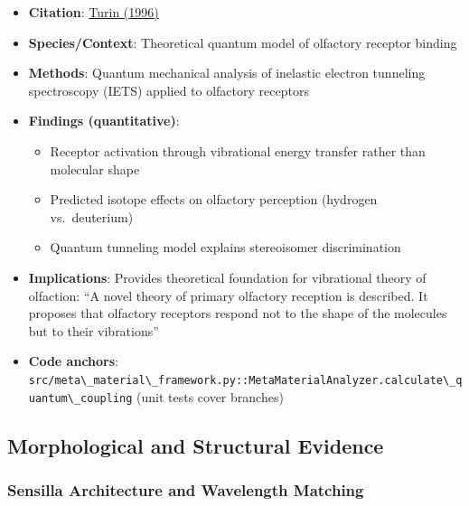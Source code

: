 \documentclass[
  13pt,
  a4paperpaper,
  12pt]{article}
\newcommand{\passthrough}[1]{#1}
\providecommand{\tightlist}{%
  \setlength{\itemsep}{0pt}\setlength{\parskip}{0pt}}
\begin{document}
\begin{itemize}
\tightlist
\item
  \textbf{Citation}:
  \href{https://doi.org/10.1093/chemse/21.6.773}{Turin (1996)}
\item
  \textbf{Species/Context}: Theoretical quantum model of olfactory
  receptor binding
\item
  \textbf{Methods}: Quantum mechanical analysis of inelastic electron
  tunneling spectroscopy (IETS) applied to olfactory receptors
\item
  \textbf{Findings (quantitative)}:

  \begin{itemize}
  \tightlist
  \item
    Receptor activation through vibrational energy transfer rather than
    molecular shape
  \item
    Predicted isotope effects on olfactory perception (hydrogen
    vs.~deuterium)
  \item
    Quantum tunneling model explains stereoisomer discrimination
  \end{itemize}
\item
  \textbf{Implications}: Provides theoretical foundation for vibrational
  theory of olfaction: ``A novel theory of primary olfactory reception
  is described. It proposes that olfactory receptors respond not to the
  shape of the molecules but to their vibrations''
\item
  \textbf{Code anchors}:
  \passthrough{\lstinline!src/meta\_material\_framework.py::MetaMaterialAnalyzer.calculate\_quantum\_coupling!}
  (unit tests cover branches)
\end{itemize}

\subsection{Morphological and Structural
Evidence}\label{morphological-and-structural-evidence}

\subsubsection{Sensilla Architecture and Wavelength
Matching}\label{sensilla-architecture-and-wavelength-matching}
\end{document}
